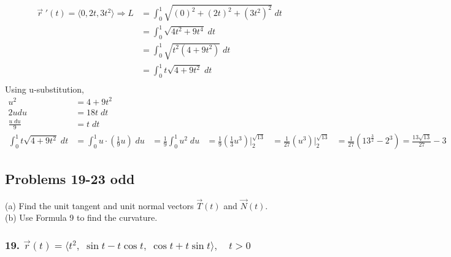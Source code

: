\documentclass{article}
\begin{document}
\begin{align*}
    \vec{r}\; '(t) = \langle{0, 2t, 3t^2} \rangle \Rightarrow
    L &= \int_{0}^{1} \sqrt{(0)^2 + (2t)^2 + (3t^2)^2}\; dt \\
      &= \int_{0}^{1} \sqrt{4t^2 + 9t^4}\; dt \\
      &= \int_{0}^{1} \sqrt{t^2(4 + 9t^2)}\; dt \\
      &= \int_{0}^{1} t\sqrt{4 + 9t^2}\; dt \\
\end{align*}
Using u-substitution,
\begin{align*}
    u^2 &= 4 + 9t^2 \\
    2udu &= 18t\; dt \\
    \frac{u\;du}{9} &= t\; dt \\
    \int_{0}^{1} t\sqrt{4 + 9t^2}\; dt
                    &= \int_{0}^{1} u \cdot(\frac{1}{9} u) \; du
                    &= \frac{1}{9} \int_{0}^{1} u^2\; du
                    &= \frac{1}{9} (\frac{1}{3} u^3) \Big|_{2}^{\sqrt{13}}
                    &= \frac{1}{27} (u^3) \Big|_{2}^{\sqrt{13}}
                    &= \frac{1}{27} (13^{\frac{3}{2}} - 2^3) = \frac{13\sqrt{13}}{27} - 3
\end{align*}

\subsection*{Problems 19-23 odd}

(a) Find the unit tangent and unit normal vectors $\vec{T}(t)$ and $\vec{N}(t)$. \\
(b) Use Formula 9 to find the curvature.


\subsubsection*{19. $\vec{r}(t) = \langle{t^2,\; \sin{t} - t\cos{t},\; \cos{t} + t\sin{t}} \rangle, \quad t > 0$}
\end{document}
